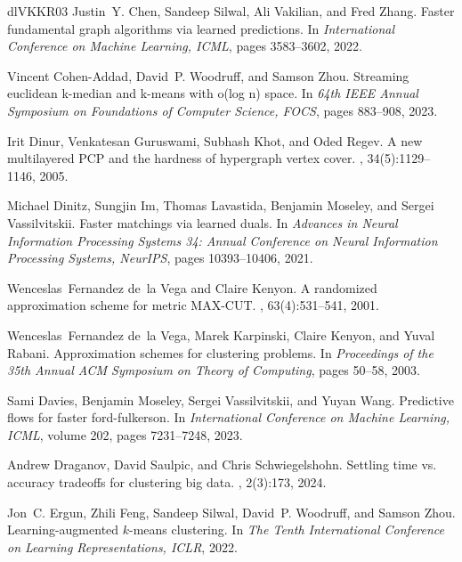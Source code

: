 \documentclass[10pt,a4paper]{amsart}
\begin{document}
\begin{thebibliography}{dlVKKR03}
Justin~Y. Chen, Sandeep Silwal, Ali Vakilian, and Fred Zhang.
\newblock Faster fundamental graph algorithms via learned predictions.
\newblock In {\em International Conference on Machine Learning, {ICML}}, pages 3583--3602, 2022.

Vincent Cohen{-}Addad, David~P. Woodruff, and Samson Zhou.
\newblock Streaming euclidean k-median and k-means with o(log n) space.
\newblock In {\em 64th {IEEE} Annual Symposium on Foundations of Computer Science, {FOCS}}, pages 883--908, 2023.

Irit Dinur, Venkatesan Guruswami, Subhash Khot, and Oded Regev.
\newblock A new multilayered {PCP} and the hardness of hypergraph vertex cover.
, 34(5):1129--1146, 2005.

Michael Dinitz, Sungjin Im, Thomas Lavastida, Benjamin Moseley, and Sergei Vassilvitskii.
\newblock Faster matchings via learned duals.
\newblock In {\em Advances in Neural Information Processing Systems 34: Annual Conference on Neural Information Processing Systems, NeurIPS}, pages 10393--10406, 2021.

Wenceslas~Fernandez de~la Vega and Claire Kenyon.
\newblock A randomized approximation scheme for metric {MAX-CUT}.
, 63(4):531--541, 2001.

Wenceslas~Fernandez de~la Vega, Marek Karpinski, Claire Kenyon, and Yuval Rabani.
\newblock Approximation schemes for clustering problems.
\newblock In {\em Proceedings of the 35th Annual {ACM} Symposium on Theory of Computing}, pages 50--58, 2003.

Sami Davies, Benjamin Moseley, Sergei Vassilvitskii, and Yuyan Wang.
\newblock Predictive flows for faster ford-fulkerson.
\newblock In {\em International Conference on Machine Learning, {ICML}}, volume 202, pages 7231--7248, 2023.

Andrew Draganov, David Saulpic, and Chris Schwiegelshohn.
\newblock Settling time vs. accuracy tradeoffs for clustering big data.
, 2(3):173, 2024.

Jon~C. Ergun, Zhili Feng, Sandeep Silwal, David~P. Woodruff, and Samson Zhou.
\newblock Learning-augmented $k$-means clustering.
\newblock In {\em The Tenth International Conference on Learning Representations, {ICLR}}, 2022.


\end{thebibliography}
\end{document}
